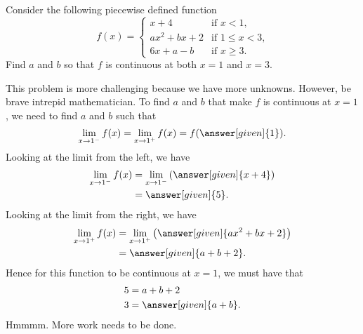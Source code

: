 \documentclass{ximera}
\begin{document}
\begin{example}
Consider the following piecewise defined function
\[
f(x) = 
\begin{cases}
  x+4 &\text{if $x<1$,}\\
  ax^2+bx+2 &\text{if $1\le x< 3$,}\\
  6x+a-b &\text{if $x\ge 3$.}
\end{cases}
\]
Find $a$ and $b$ so that $f$ is continuous at both $x=1$ and $x=3$.
\begin{explanation}
This problem is more challenging because we have more
unknowns. However, be brave intrepid mathematician.  To find $a$ and
$b$ that make $f$ is continuous at $x=1$, we need to find $a$ and $b$
such that
\[
\lim_{x\to 1^-} f(x) = \lim_{x\to 1^+}f(x)=f(\answer[given]{1}).
\]
Looking at the limit from the left, we have
\begin{align*}
  \lim_{x\to 1^-} f(x) &= \lim_{x\to 1^-} \left(\answer[given]{x+4}\right) \\
  &=\answer[given]{5}.
\end{align*}
Looking at the limit from the right, we have
\begin{align*}
  \lim_{x\to 1^+} f(x) &= \lim_{x\to 1^+} \left(\answer[given]{ax^2+bx+2}\right) \\
  &= \answer[given]{a+b+2}.
\end{align*}
Hence for this function to be continuous at $x=1$, we must have that
\begin{align*}
  5 &= a+b+2\\
  3 &= \answer[given]{a+b}.
\end{align*}
Hmmmm. More work needs to be done.


\end{explanation}
\end{example}
\end{document}
